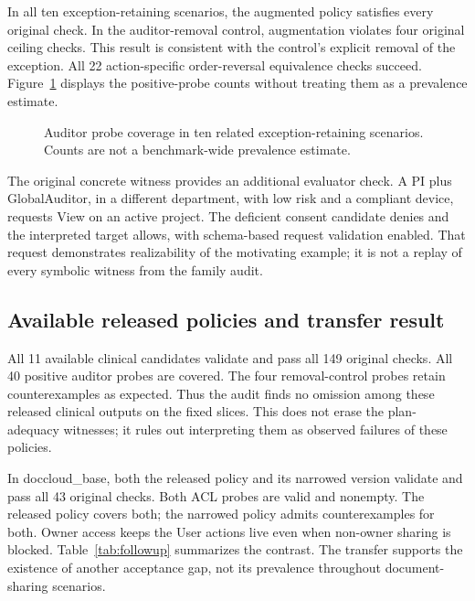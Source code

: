 \documentclass[sigconf,nonacm]{acmart}
\begin{document}
In all ten exception-retaining scenarios, the augmented policy satisfies every original check. In the auditor-removal control, augmentation violates four original ceiling checks. This result is consistent with the control's explicit removal of the exception. All 22 action-specific order-reversal equivalence checks succeed. Figure~\ref{fig:counts} displays the positive-probe counts without treating them as a prevalence estimate.

\begin{figure}[t]
\centering
{}
\caption{Auditor probe coverage in ten related exception-retaining scenarios. Counts are not a benchmark-wide prevalence estimate.}
\label{fig:counts}
\end{figure}

The original concrete witness provides an additional evaluator check. A PI plus GlobalAuditor, in a different department, with low risk and a compliant device, requests View on an active project. The deficient consent candidate denies and the interpreted target allows, with schema-based request validation enabled. That request demonstrates realizability of the motivating example; it is not a replay of every symbolic witness from the family audit.

\subsection{Available released policies and transfer result}
All 11 available clinical candidates validate and pass all 149 original checks. All 40 positive auditor probes are covered. The four removal-control probes retain counterexamples as expected. Thus the audit finds no omission among these released clinical outputs on the fixed slices. This does not erase the plan-adequacy witnesses; it rules out interpreting them as observed failures of these policies.

In doccloud\_base, both the released policy and its narrowed version validate and pass all 43 original checks. Both ACL probes are valid and nonempty. The released policy covers both; the narrowed policy admits counterexamples for both. Owner access keeps the User actions live even when non-owner sharing is blocked. Table~\ref{tab:followup} summarizes the contrast. The transfer supports the existence of another acceptance gap, not its prevalence throughout document-sharing scenarios.
\end{document}
